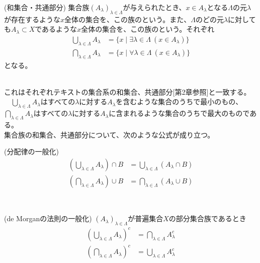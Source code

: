 \documentclass[a4j]{jsarticle}
\begin{document}
\begin{itembox}[l]{ (和集合・共通部分)}
	集合族$(A_\lambda)_{\lambda \in \Lambda}$が与えられたとき、$x \in A_\lambda$となる$\Lambda$の元$\lambda$が存在するような$x$全体の集合を、この族のという。また、$\Lambda$のどの元$\lambda$に対しても$A_\lambda \subset X$であるような$x$全体の集合を、この族のという。それぞれ
	\begin{align}
		\bigcup_{\lambda \in \Lambda}A_\lambda & = \{ x \mid \exists\lambda \in \Lambda\:(x \in A_\lambda) \} \\
		\bigcap_{\lambda \in \Lambda}A_\lambda & = \{ x \mid \forall\lambda \in \Lambda\:(x \in A_\lambda) \}
	\end{align}
	となる。
\end{itembox}\\

これはそれぞれテキスト\cite{text}の集合系の和集合、共通部分[第2章参照]と一致する。\\


　$\bigcup_{\lambda \in \Lambda}A_\lambda$はすべての$\lambda$に対する$A_\lambda$を含むような集合のうちで最小のもの、$\bigcap_{\lambda \in \Lambda}A_\lambda$はすべての$\lambda$に対する$A_\lambda$に含まれるような集合のうちで最大のものである。\\

集合族の和集合、共通部分について、次のような公式が成り立つ。\\

\begin{itembox}[l]{ (分配律の一般化)}
	\begin{align}
		\left( \bigcup_{\lambda \in \Lambda}A_\lambda \right) \cap B & = \bigcup_{\lambda \in \Lambda}(A_\lambda \cap B) \\
		\left( \bigcap_{\lambda \in \Lambda}A_\lambda \right) \cup B & = \bigcap_{\lambda \in \Lambda}(A_\lambda \cup B)
	\end{align}
\end{itembox}\\

\begin{itembox}[l]{ (de Morganの法則の一般化)}
	$(A_\lambda)_{\lambda \in \Lambda}$が普遍集合$X$の部分集合族であるとき
	\begin{align}
		\left( \bigcup_{\lambda \in \Lambda}A_\lambda \right)^c & = \bigcap_{\lambda \in \Lambda}A_\lambda^c \\
		\left( \bigcap_{\lambda \in \Lambda}A_\lambda \right)^c & = \bigcup_{\lambda \in \Lambda}A_\lambda^c
	\end{align}
\end{itembox}\\
\end{document}

